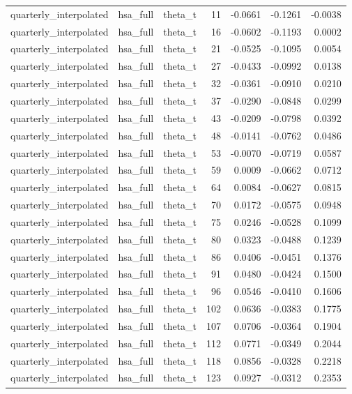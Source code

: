 \begin{tabular}{lllrrrr}
quarterly\_interpolated & hsa\_full & theta\_t & 11 & -0.0661 & -0.1261 & -0.0038 \\
quarterly\_interpolated & hsa\_full & theta\_t & 16 & -0.0602 & -0.1193 & 0.0002 \\
quarterly\_interpolated & hsa\_full & theta\_t & 21 & -0.0525 & -0.1095 & 0.0054 \\
quarterly\_interpolated & hsa\_full & theta\_t & 27 & -0.0433 & -0.0992 & 0.0138 \\
quarterly\_interpolated & hsa\_full & theta\_t & 32 & -0.0361 & -0.0910 & 0.0210 \\
quarterly\_interpolated & hsa\_full & theta\_t & 37 & -0.0290 & -0.0848 & 0.0299 \\
quarterly\_interpolated & hsa\_full & theta\_t & 43 & -0.0209 & -0.0798 & 0.0392 \\
quarterly\_interpolated & hsa\_full & theta\_t & 48 & -0.0141 & -0.0762 & 0.0486 \\
quarterly\_interpolated & hsa\_full & theta\_t & 53 & -0.0070 & -0.0719 & 0.0587 \\
quarterly\_interpolated & hsa\_full & theta\_t & 59 & 0.0009 & -0.0662 & 0.0712 \\
quarterly\_interpolated & hsa\_full & theta\_t & 64 & 0.0084 & -0.0627 & 0.0815 \\
quarterly\_interpolated & hsa\_full & theta\_t & 70 & 0.0172 & -0.0575 & 0.0948 \\
quarterly\_interpolated & hsa\_full & theta\_t & 75 & 0.0246 & -0.0528 & 0.1099 \\
quarterly\_interpolated & hsa\_full & theta\_t & 80 & 0.0323 & -0.0488 & 0.1239 \\
quarterly\_interpolated & hsa\_full & theta\_t & 86 & 0.0406 & -0.0451 & 0.1376 \\
quarterly\_interpolated & hsa\_full & theta\_t & 91 & 0.0480 & -0.0424 & 0.1500 \\
quarterly\_interpolated & hsa\_full & theta\_t & 96 & 0.0546 & -0.0410 & 0.1606 \\
quarterly\_interpolated & hsa\_full & theta\_t & 102 & 0.0636 & -0.0383 & 0.1775 \\
quarterly\_interpolated & hsa\_full & theta\_t & 107 & 0.0706 & -0.0364 & 0.1904 \\
quarterly\_interpolated & hsa\_full & theta\_t & 112 & 0.0771 & -0.0349 & 0.2044 \\
quarterly\_interpolated & hsa\_full & theta\_t & 118 & 0.0856 & -0.0328 & 0.2218 \\
quarterly\_interpolated & hsa\_full & theta\_t & 123 & 0.0927 & -0.0312 & 0.2353 \\

\end{tabular}
